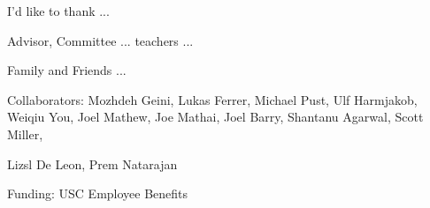 

I'd like to thank ... 

Advisor, Committee ... teachers ...

Family and Friends ...

Collaborators:
Mozhdeh Geini,
Lukas Ferrer,
Michael Pust,
Ulf Harmjakob,
Weiqiu You,
Joel Mathew, 
Joe Mathai,
Joel Barry,
Shantanu Agarwal,
Scott Miller,


Lizsl De Leon,
Prem Natarajan

Funding:
USC Employee Benefits



